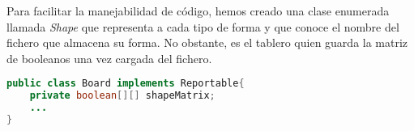 \documentclass{article}
\begin{document}
Para facilitar la manejabilidad de código, hemos creado una clase enumerada llamada \textit{Shape} que representa a cada tipo de forma y que conoce el nombre del fichero que almacena su forma. No obstante, es el tablero quien guarda la matriz de booleanos una vez cargada del fichero.

\begin{lstlisting}[frame=single, language=Java]
public class Board implements Reportable{
	private boolean[][] shapeMatrix;
	...
}
\end{lstlisting}
\end{document}
